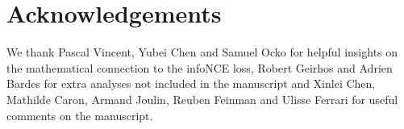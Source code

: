 \documentclass{article}
\begin{document}





\section*{Acknowledgements}
We thank Pascal Vincent, Yubei Chen and Samuel Ocko for helpful insights on the mathematical connection to the infoNCE loss, Robert Geirhos and Adrien Bardes for extra analyses not included in the manuscript and Xinlei Chen, Mathilde Caron, Armand Joulin, Reuben Feinman and Ulisse Ferrari for useful comments on the manuscript.






\end{document}
